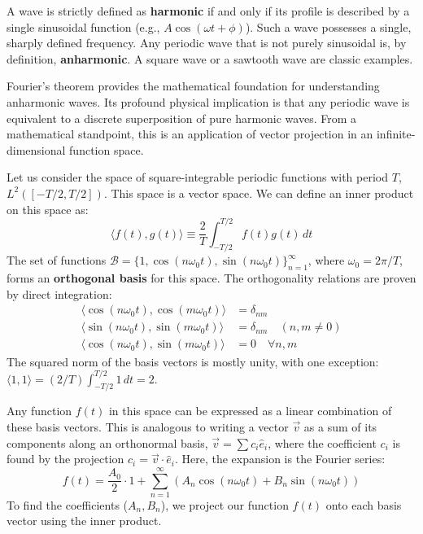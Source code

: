 \begin{definition}
A wave is strictly defined as \textbf{harmonic} if and only if its profile is described by a single sinusoidal function (e.g., $A\cos(\omega t + \phi)$). Such a wave possesses a single, sharply defined frequency.
Any periodic wave that is not purely sinusoidal is, by definition, \textbf{anharmonic}. A square wave or a sawtooth wave are classic examples.

\begin{theorem}
Fourier's theorem provides the mathematical foundation for understanding anharmonic waves. Its profound physical implication is that any periodic wave is equivalent to a discrete superposition of pure harmonic waves. From a mathematical standpoint, this is an application of vector projection in an infinite-dimensional function space.

Let us consider the space of square-integrable periodic functions with period $T$, $L^2([-T/2, T/2])$. This space is a vector space. We can define an inner product on this space as:
$$ \langle f(t), g(t) \rangle \equiv \frac{2}{T} \int_{-T/2}^{T/2} f(t)g(t) \,dt $$
The set of functions $\mathcal{B} = \{1, \cos(n\omega_0 t), \sin(n\omega_0 t) \}_{n=1}^\infty$, where $\omega_0 = 2\pi/T$, forms an \textbf{orthogonal basis} for this space. The orthogonality relations are proven by direct integration:
\begin{align*}
    \langle \cos(n\omega_0 t), \cos(m\omega_0 t) \rangle &= \delta_{nm} \\
    \langle \sin(n\omega_0 t), \sin(m\omega_0 t) \rangle &= \delta_{nm} \quad (n, m \neq 0) \\
    \langle \cos(n\omega_0 t), \sin(m\omega_0 t) \rangle &= 0 \quad \forall n, m
\end{align*}
The squared norm of the basis vectors is mostly unity, with one exception: $\langle 1, 1 \rangle = (2/T)\int_{-T/2}^{T/2} 1 \,dt = 2$.

Any function $f(t)$ in this space can be expressed as a linear combination of these basis vectors. This is analogous to writing a vector $\vec{v}$ as a sum of its components along an orthonormal basis, $\vec{v} = \sum c_i \hat{e}_i$, where the coefficient $c_i$ is found by the projection $c_i = \vec{v} \cdot \hat{e}_i$.
Here, the expansion is the Fourier series:
$$ f(t) = \frac{A_0}{2} \cdot 1 + \sum_{n=1}^{\infty} \left( A_n \cos(n\omega_0 t) + B_n \sin(n\omega_0 t) \right) $$
To find the coefficients ($A_n, B_n$), we project our function $f(t)$ onto each basis vector using the inner product.


\end{theorem}
\end{definition}
